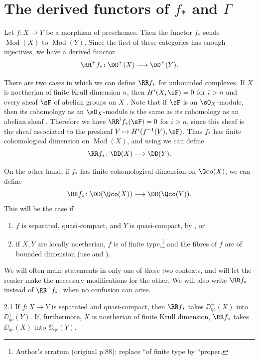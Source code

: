 \section{The derived functors of $f_*$ and $\Gamma$}\label{sec:2.2}

Let $f\colon X\to Y$ be a morphism of preschemes. Then the functor $f_*$ sends $\operatorname{Mod}(X)$ to $\operatorname{Mod}(Y)$. Since the first of these categories has enough injectives, we have a derived functor
\[
\RR^+f_*\colon \DD^+(X) \longrightarrow \DD^+(Y).
\]

There are two cases in which we can define $\RR f_*$ for unbounded complexes. If $X$ is noetherian of finite Krull dimension $n$, then $H^i(X,\sF)=0$ for $i>n$ and every sheaf $\sF$ of abelian groups on $X$ \cite[.5]{T}. Note that if $\sF$ is an $\sO_X$-module, then its cohomology as an $\sO_X$-module is the same as its cohomology as an abelian sheaf \cite[\nopp $0_{\mathrm{III}}$, 12.1.1]{EGA}. Therefore we have $\RR^if_*(\sF)=0$ for $i>n$, since this sheaf is the sheaf associated to the presheaf $V\mapsto H^i(f^{-1}(V),\sF)$. Thus $f_*$ has finite cohomological dimension on $\operatorname{Mod}(X)$, and using  we can define
\[
\RR f_*\colon \DD(X) \longrightarrow \DD(Y).
\]

On the other hand, if $f_*$ has finite cohomological dimension on $\Qco(X)$, we can define
\[
\RR f_*\colon \DD(\Qco(X)) \longrightarrow \DD(\Qco(Y)).
\]
This will be the case if
\begin{enumerate}
\item[a)] $f$ is separated, quasi-compact, and $Y$ is quasi-compact, by \cite[\nopp III,~1.4.12]{EGA}, or
\item[b)] if $X,Y$ are locally noetherian, $f$ is of finite type,\footnote{Author's erratum (original p.88): replace ``of finite type by ``proper.} and the fibres of $f$ are of bounded dimension (use \cite[\nopp III,~4.1.5]{EGA} and \cite[.5]{T}).
\end{enumerate}

We will often make statements in only one of these two contexts, and will let the reader make the necessary modifications for the other. We will also write $\RR f_*$ instead of $\RR^+f_*$, when no confusion can arise.

\begin{bookproposition}{2.1}\label{prop:2.2.1}
If $f\colon X\to Y$ is separated and quasi-compact, then $\RR f_*$ takes $\DD_{\mathrm{qc}}^+(X)$ into $\DD_{\mathrm{qc}}^+(Y)$. If, furthermore, $X$ is noetherian of finite Krull dimension, $\RR f_*$ takes $\DD_{\mathrm{qc}}(X)$ into $\DD_{\mathrm{qc}}(Y)$.
\end{bookproposition}

